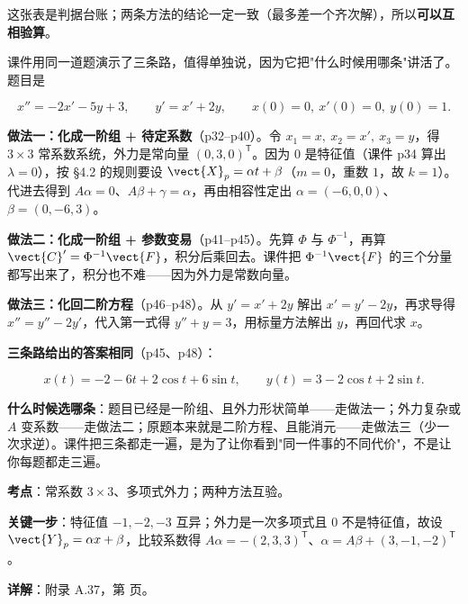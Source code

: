 \documentclass[11pt]{ctexart}
\renewcommand{\qbreak}{\needspace{0.26\textheight}}
\begin{document}
这张表是判据台账；两条方法的结论一定一致（最多差一个齐次解），所以\textbf{可以互相验算}。


课件用同一道题演示了三条路，值得单独说，因为它把"什么时候用哪条"讲活了。题目是

\[
x''=-2x'-5y+3,\qquad y'=x'+2y,\qquad x(0)=0,\ x'(0)=0,\ y(0)=1 .
\]

\textbf{做法一：化成一阶组 + 待定系数}（p32--p40）。令 $x_1=x,\ x_2=x',\ x_3=y$，得 $3\times3$ 常系数系统，外力是常向量 $(0,3,0)^{\mathsf T}$。因为 $0$ 是特征值（课件 p34 算出 $\lambda=0$），按 §4.2 的规则要设 $\vect{X}_p=\alpha t+\beta$（$m=0$，重数 $1$，故 $k=1$）。代进去得到 $A\alpha=0$、$A\beta+\gamma=\alpha$，再由相容性定出 $\alpha=(-6,0,0)$、$\beta=(0,-6,3)$。

\textbf{做法二：化成一阶组 + 参数变易}（p41--p45）。先算 $\Phi$ 与 $\Phi^{-1}$，再算 $\vect{C}'=\Phi^{-1}\vect{F}$，积分后乘回去。课件把 $\Phi^{-1}\vect{F}$ 的三个分量都写出来了，积分也不难——因为外力是常数向量。

\textbf{做法三：化回二阶方程}（p46--p48）。从 $y'=x'+2y$ 解出 $x'=y'-2y$，再求导得 $x''=y''-2y'$，代入第一式得 $y''+y=3$，用标量方法解出 $y$，再回代求 $x$。

\textbf{三条路给出的答案相同}（p45、p48）：

\[
x(t)=-2-6t+2\cos t+6\sin t,\qquad y(t)=3-2\cos t+2\sin t .
\]

\textbf{什么时候选哪条}：题目已经是一阶组、且外力形状简单——走做法一；外力复杂或 $A$ 变系数——走做法二；原题本来就是二阶方程、且能消元——走做法三（少一次求逆）。课件把三条都走一遍，是为了让你看到"同一件事的不同代价"，不是让你每题都走三遍。


\qbreak
{}
\par\textbf{考点}：常系数 $3\times3$、多项式外力；两种方法互验。
\par\textbf{关键一步}：特征值 $-1,-2,-3$ 互异；外力是一次多项式且 $0$ 不是特征值，故设 $\vect{Y}_p=\alpha x+\beta$，比较系数得 $A\alpha=-(2,3,3)^{\mathsf T}$、$\alpha=A\beta+(3,-1,-2)^{\mathsf T}$。
\par\textbf{详解}：附录 A.37，第 \pageref{c4:app:hw} 页。
\end{document}
